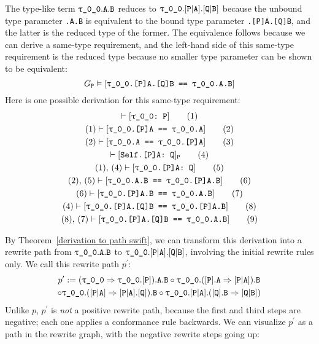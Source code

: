 \documentclass[../generics]{subfiles}
\begin{document}
\begin{example}
The type-like term $\texttt{$\uptau$\_0\_0}.\texttt{A}.\texttt{B}$ reduces to $\texttt{$\uptau$\_0\_0}.[\texttt{P}|\texttt{A}].[\texttt{Q}|\texttt{B}]$ because the unbound type parameter \texttt{.A.B} is equivalent to the bound type parameter \texttt{.[P]A.[Q]B}, and the latter is the reduced type of the former. The equivalence follows because we can derive a same-type requirement, and the left-hand side of this same-type requirement is the reduced type because no smaller type parameter can be shown to be equivalent:
\[G_\texttt{P}\vDash[\texttt{\texttt{$\uptau$\_0\_0}.[P]A.[Q]B == \texttt{$\uptau$\_0\_0}.A.B}]\]
Here is one possible derivation for this same-type requirement:
\begin{gather*}
\vdash[\texttt{\texttt{$\uptau$\_0\_0}:~P}]\tag{1}\\
(1)\vdash[\texttt{\texttt{$\uptau$\_0\_0}.[P]A == \texttt{$\uptau$\_0\_0}.A}]\tag{2}\\
(2)\vdash[\texttt{\texttt{$\uptau$\_0\_0}.A == \texttt{$\uptau$\_0\_0}.[P]A}]\tag{3}\\
\vdash[\texttt{Self.[P]A:~Q}]_\texttt{P}\tag{4}\\
(1),\,(4)\vdash[\texttt{\texttt{$\uptau$\_0\_0}.[P]A:~Q}]\tag{5}\\
(2),\,(5)\vdash[\texttt{\texttt{$\uptau$\_0\_0}.A.B == \texttt{$\uptau$\_0\_0}.[P]A.B}]\tag{6}\\
(6)\vdash[\texttt{\texttt{$\uptau$\_0\_0}.[P]A.B == \texttt{$\uptau$\_0\_0}.A.B}]\tag{7}\\
(4)\vdash[\texttt{\texttt{$\uptau$\_0\_0}.[P]A.[Q]B == \texttt{$\uptau$\_0\_0}.[P]A.B}]\tag{8}\\
(8),\,(7)\vdash[\texttt{\texttt{$\uptau$\_0\_0}.[P]A.[Q]B == \texttt{$\uptau$\_0\_0}.A.B}]\tag{9}
\end{gather*}

By Theorem~\ref{derivation to path swift}, we can transform this derivation into a rewrite path from $\texttt{$\uptau$\_0\_0}.\texttt{A}.\texttt{B}$ to $\texttt{$\uptau$\_0\_0}.[\texttt{P}|\texttt{A}].[\texttt{Q}|\texttt{B}]$, involving the initial rewrite rules only. We call this rewrite path $p^\prime$:
\begin{multline*}
p^\prime := (\texttt{$\uptau$\_0\_0}\Rightarrow \texttt{$\uptau$\_0\_0}.[\texttt{P}]).\texttt{A}.\texttt{B} \circ \texttt{$\uptau$\_0\_0}.([\texttt{P}].\texttt{A}\Rightarrow[\texttt{P}|\texttt{A}]).\texttt{B}\\
\circ \texttt{$\uptau$\_0\_0}.([\texttt{P}|\texttt{A}]\Rightarrow [\texttt{P}|\texttt{A}].[\texttt{Q}]).\texttt{B} \circ \texttt{$\uptau$\_0\_0}.[\texttt{P}|\texttt{A}].([\texttt{Q}].\texttt{B}\Rightarrow[\texttt{Q}|\texttt{B}])
\end{multline*}
Unlike $p$, $p^\prime$ is \emph{not} a positive rewrite path, because the first and third steps are negative; each one applies a conformance rule backwards. We can visualize $p^\prime$ as a path in the rewrite graph, with the negative rewrite steps going up:
\begin{center}
\end{center}


\end{example}
\end{document}
